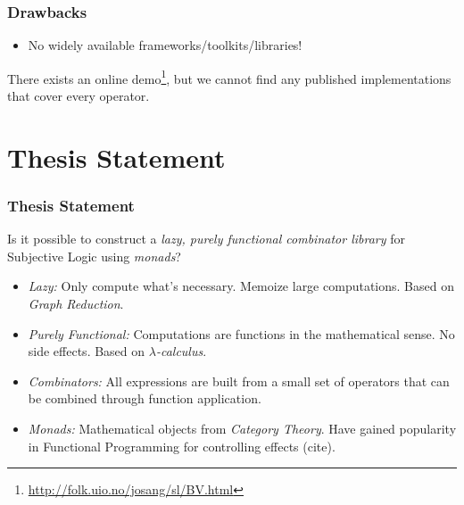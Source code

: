 \documentclass{beamer}
\begin{document}

\begin{frame}
\frametitle{Drawbacks}

\begin{itemize}
  \item No widely available frameworks/toolkits/libraries!
\end{itemize}

There exists an online demo\footnote{\url{http://folk.uio.no/josang/sl/BV.html}},
but we cannot find any published implementations that cover every operator.

\end{frame}

%
%

\section{Thesis Statement}

\begin{frame}
\frametitle{Thesis Statement}

Is it possible to construct a \emph{lazy, purely functional combinator library} for Subjective
Logic using \emph{monads}?

\begin{itemize}
  \item \emph{Lazy:} Only compute what's necessary. Memoize large computations. Based
    on \emph{Graph Reduction}.
  \item \emph{Purely Functional:} Computations are functions in the mathematical sense.
    No side effects. Based on \emph{$\lambda$-calculus}.
  \item \emph{Combinators:} All expressions are built from a small set of operators that
    can be combined through function application.
  \item \emph{Monads:} Mathematical objects from \emph{Category Theory}. Have gained
    popularity in Functional Programming for controlling effects (cite).
\end{itemize}

\end{frame}

\end{document}
